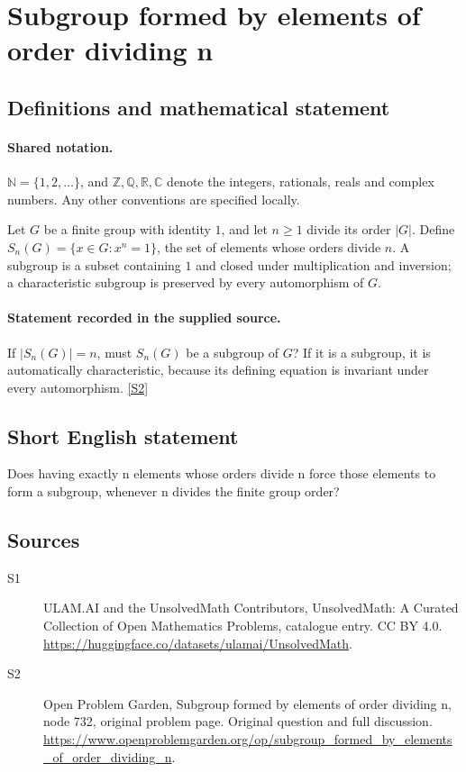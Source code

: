 \documentclass[11pt]{article}
\newcommand{\sref}[2]{\hyperlink{source:#1:#2}{[S#2]}}
\begin{document}
\section{Subgroup formed by elements of order dividing n}\label{statement}

\subsection{Definitions and mathematical statement}

\paragraph{Shared notation.}$\mathbb N=\{1,2,\ldots\}$, and $\mathbb Z,\mathbb Q,\mathbb R,\mathbb C$ denote the integers, rationals, reals and complex numbers. Any other conventions are specified locally.


Let $G$ be a finite group with identity $1$, and let $n\geq1$ divide its order $|G|$. Define $S_n(G)=\{x\in G:x^n=1\}$, the set of elements whose orders divide $n$. A subgroup is a subset containing $1$ and closed under multiplication and inversion; a characteristic subgroup is preserved by every automorphism of $G$.
\paragraph{Statement recorded in the supplied source.}
If $|S_n(G)|=n$, must $S_n(G)$ be a subgroup of $G$? If it is a subgroup, it is automatically characteristic, because its defining equation is invariant under every automorphism. \sref{statement}{2}
\subsection{Short English statement}
Does having exactly n elements whose orders divide n force those elements to form a subgroup, whenever n divides the finite group order?
\subsection{Sources}
\begin{description}
\item[\hypertarget{source:statement:1}{S1}] ULAM.AI and the UnsolvedMath Contributors, UnsolvedMath: A Curated Collection of Open Mathematics Problems, catalogue entry. CC BY 4.0. \url{https://huggingface.co/datasets/ulamai/UnsolvedMath}.
\item[\hypertarget{source:statement:2}{S2}] Open Problem Garden, Subgroup formed by elements of order dividing n, node 732, original problem page. Original question and full discussion. \url{https://www.openproblemgarden.org/op/subgroup_formed_by_elements_of_order_dividing_n}.

\end{description}
\label{end:statement}
\end{document}
